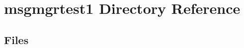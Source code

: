 \section{msgmgrtest1 Directory Reference}
\label{dir_6c168fd747e126719f2361a0f14aa506}
\subsection*{Files}
\begin{DoxyCompactItemize}
\end{DoxyCompactItemize}
